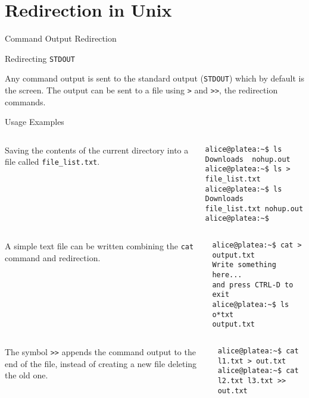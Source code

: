 \section{Redirection in Unix}
\begin{frame}[t,fragile]{Command Output Redirection}
  \begin{block}{Redirecting \alert{\texttt{STDOUT}}}
    {\footnotesize Any command output is sent to the standard output
      (\texttt{STDOUT}) which by default is the screen. The output can be sent to a file using \alert{\texttt{>}} and
\alert{\texttt{>>}}, the redirection commands.

  Usage Examples
}

  {\scriptsize

  \begin{columns}
       Saving the contents of the current directory into a file called \texttt{file\_list.txt}.
        \hspace{-3cm}
      {\tiny
        \begin{lstlisting}
alice@platea:~$ ls
Downloads  nohup.out
alice@platea:~$ ls > file_list.txt
alice@platea:~$ ls
Downloads  file_list.txt nohup.out 
alice@platea:~$
        \end{lstlisting}
      }
    \end{columns}
  \begin{columns}
        A simple text file can be written combining the
  \texttt{cat} command and redirection.
        \hspace{-3cm}
      {\tiny
        \begin{lstlisting}
alice@platea:~$ cat > output.txt
Write something here...
and press CTRL-D to exit
alice@platea:~$ ls o*txt
output.txt
        \end{lstlisting}
      }
    \end{columns}
  \begin{columns}
        The symbol \alert{\texttt{>>}} appends the command output to the end of the file, instead of creating a new file deleting the old one.
        \hspace{-3cm}
      {\tiny
        \begin{lstlisting}
alice@platea:~$ cat l1.txt > out.txt
alice@platea:~$ cat l2.txt l3.txt >> out.txt
        \end{lstlisting}
      }
    \end{columns}
}
  \end{block}
  
\end{frame}
